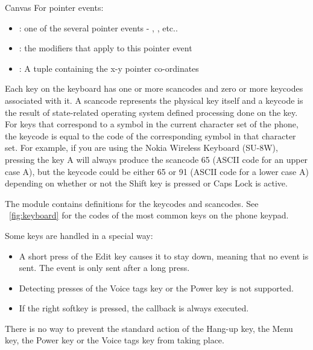 \begin{classdesc}{Canvas}{}
For pointer events:
\begin{itemize}
\item {}: one of the several pointer events - , 
,  etc..
\item {}: the modifiers that apply to this pointer event
\item {}: A tuple containing the x-y pointer co-ordinates
\end{itemize}

Each key on the keyboard has one or more scancodes and zero or more keycodes 
associated with it. A scancode represents the physical key itself and a 
keycode is the result of state-related operating system defined processing 
done on the key. For keys that correspond to a symbol in the current 
character set of the phone, the keycode is equal to the code of the 
corresponding symbol in that character set. For example, if you are using 
the Nokia Wireless Keyboard (SU-8W), pressing the key A will always produce 
the scancode 65 (ASCII code for an upper case A), but the keycode 
could be either 65 or 91 (ASCII code for a lower case A) depending on 
whether or not the Shift key is pressed or Caps Lock is active. 

The  module contains definitions for the keycodes and 
scancodes. See \figurename~\ref{fig:keyboard} for the codes of the most 
common keys on the phone keypad. 

Some keys are handled in a special way:

\begin{itemize}
\item A short press of the Edit key causes it to stay down, meaning that no  event is sent. The event is only sent after a long press.
\item Detecting presses of the Voice tags key or the Power key is not supported.
\item If the right softkey is pressed, the  callback is always executed.
\end{itemize}

There is no way to prevent the standard action of the Hang-up key, the Menu 
key, the Power key or the Voice tags key from taking place.


\end{classdesc}
